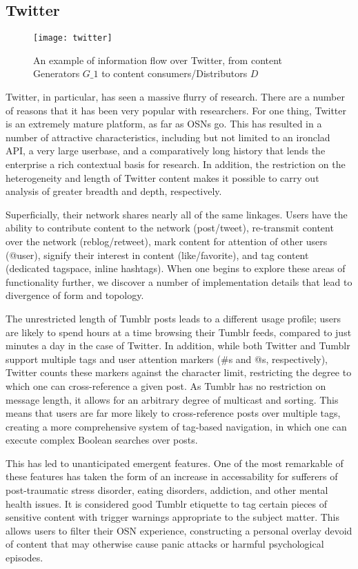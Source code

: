 \subsection{Twitter}
\begin{figure}[bht]
\centering
 \texttt{[image: twitter]}
 \caption{An example of information flow over Twitter, from content Generators \(G\_1\) to content consumers/Distributors \(D\)}
 \label{fig:twitter}
\end{figure}
Twitter, in particular, has seen a massive flurry of research.  There 
are a number of reasons that it has been very popular with researchers.  
For one thing, Twitter is an extremely mature platform, as far as OSNs 
go.  This has resulted in a number of attractive characteristics, 
including but not limited to an ironclad API, a very large 
userbase\cite{krishnamurthy2008few}, 
and a comparatively long history that lends the enterprise a rich 
contextual basis for research.  In addition, the restriction on the 
heterogeneity and length of Twitter content makes it possible to carry 
out analysis of greater breadth and depth, respectively.


Superficially, their network shares nearly all of the same linkages.  
Users have the ability to contribute content to the network 
(post/tweet), re-transmit content over the network (reblog/retweet), 
mark content for attention of other users (@user), signify their 
interest in content (like/favorite), and tag content (dedicated 
tagspace, inline hashtags). When one begins to explore these areas of 
functionality further, we discover a number of implementation details 
that lead to divergence of form and topology.  

The unrestricted length of Tumblr posts leads to a different usage 
profile; users are likely to spend hours at a time\cite{fox2012much} 
browsing their Tumblr feeds, compared to just minutes a day in the case 
of Twitter.  In addition, while both Twitter and Tumblr support multiple 
tags and user attention markers (\#s and @s, respectively), Twitter 
counts these markers against the character limit, restricting the degree 
to which one can cross-reference a given post.  As Tumblr has no restriction 
on message length, it allows for an arbitrary degree of multicast and 
sorting.  This means that users are far more likely to cross-reference 
posts over multiple tags, creating a more comprehensive system of tag-based 
navigation, in which one can execute complex Boolean searches over posts.  


This has led to unanticipated emergent features. One of the most 
remarkable of these features has taken the form of an increase in 
accessability for sufferers of post-traumatic stress disorder, 
eating disorders\cite{callaghan2013research}, addiction, and other 
mental health issues.  It is considered good Tumblr etiquette to tag 
certain pieces of sensitive content with trigger 
warnings\cite{bell2013trigger} appropriate to the subject matter.  
This allows users to filter\cite{tumblrsavior} their OSN experience, 
constructing a personal overlay devoid of content that may otherwise 
cause panic attacks or harmful psychological episodes.


